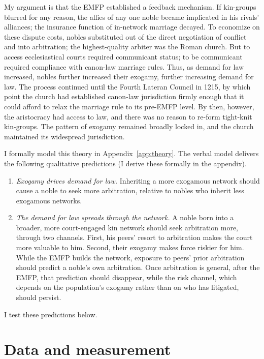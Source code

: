 \documentclass[12pt]{article}
\theoremstyle{definition}
\theoremstyle{remark}
\begin{document}
My argument is that the EMFP established a feedback mechanism. If kin-groups blurred for any reason, the allies of any one noble became implicated in his rivals' alliances; the insurance function of in-network marriage decayed. To economize on these dispute costs, nobles substituted out of the direct negotiation of conflict and into arbitration; the highest-quality arbiter was the Roman church. But to access ecclesiastical courts required communicant status; to be communicant required compliance with canon-law marriage rules. Thus, as demand for law increased, nobles further increased their exogamy, further increasing demand for law. The process continued until the Fourth Lateran Council in 1215, by which point the church had established canon-law jurisdiction firmly enough that it could afford to relax the marriage rule to its pre-EMFP level. By then, however, the aristocracy had access to law, and there was no reason to re-form tight-knit kin-groups. The pattern of exogamy remained broadly locked in, and the church maintained its widespread jurisdiction.

I formally model this theory in Appendix~\ref{app:theory}. The verbal model delivers the following qualitative predictions (I derive these formally in the appendix).
\begin{enumerate}
    \item \textit{Exogamy drives demand for law.} Inheriting a more exogamous network should cause a noble to seek more arbitration, relative to nobles who inherit less exogamous networks.
    \item \textit{The demand for law spreads through the network.} A noble born into a broader, more court-engaged kin network should seek arbitration more, through two channels. First, his peers' resort to arbitration makes the court more valuable to him. Second, their exogamy makes force riskier for him. While the EMFP builds the network, exposure to peers' prior arbitration should predict a noble's own arbitration. Once arbitration is general, after the EMFP, that prediction should disappear, while the risk channel, which depends on the population's exogamy rather than on who has litigated, should persist.
\end{enumerate}
I test these predictions below.



\section{Data and measurement}
\label{sec:measurement}
\end{document}
